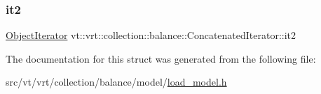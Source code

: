 \mbox{\label{structvt_1_1vrt_1_1collection_1_1balance_1_1_concatenated_iterator_af2563b4159d20a1d75acb9dc31c06107}} 
\subsubsection{\texorpdfstring{it2}{it2}}
{\footnotesize\ttfamily \hyperlink{structvt_1_1vrt_1_1collection_1_1balance_1_1_object_iterator}{Object\+Iterator} vt\+::vrt\+::collection\+::balance\+::\+Concatenated\+Iterator\+::it2}



The documentation for this struct was generated from the following file\+:\begin{DoxyCompactItemize}
\item 
src/vt/vrt/collection/balance/model/\hyperlink{load__model_8h}{load\+\_\+model.\+h}\end{DoxyCompactItemize}
